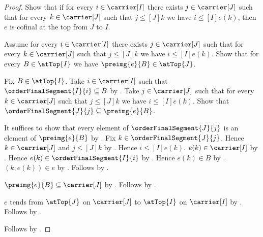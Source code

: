 \begin{proof}
    Show that if for every $i\in\carrier[I]$ there exists
        $j\in\carrier[J]$ such that for every $k\in\carrier[J]$
        such that $j\mathrel{\leq[J]}k$ we have
        $i\mathrel{\leq[I]}e(k)$, then
        $e$ is cofinal at the top from $J$ to $I$.
    \begin{subproof}
        Assume for every $i\in\carrier[I]$ there exists
            $j\in\carrier[J]$ such that for every $k\in\carrier[J]$
            such that $j\mathrel{\leq[J]}k$ we have
            $i\mathrel{\leq[I]}e(k)$.
        Show that for every $B\in\atTop{I}$ we have
            $\preimg{e}{B}\in\atTop{J}$.
        \begin{subproof}
            Fix $B\in\atTop{I}$.
            Take $i\in\carrier[I]$ such that
                $\orderFinalSegment{I}{i}\subseteq B$ by
                .
            Take $j\in\carrier[J]$ such that for every
                $k\in\carrier[J]$ such that
                $j\mathrel{\leq[J]}k$ we have
                $i\mathrel{\leq[I]}e(k)$.
            Show that $\orderFinalSegment{J}{j}\subseteq
                \preimg{e}{B}$.
            \begin{subproof}
                It suffices to show that every element of
                    $\orderFinalSegment{J}{j}$ is an element of
                    $\preimg{e}{B}$ by .
                Fix $k\in\orderFinalSegment{J}{j}$.
                Hence $k\in\carrier[J]$ and
                    $j\mathrel{\leq[J]}k$ by
                    .
                Hence $i\mathrel{\leq[I]}e(k)$.
                $e(k)\in\carrier[I]$ by .
                Hence $e(k)\in\orderFinalSegment{I}{i}$ by
                    .
                Hence $e(k)\in B$ by .
                $(k,e(k))\in e$ by
                    .
                Follows by .
            \end{subproof}
            $\preimg{e}{B}\subseteq\carrier[J]$ by
                .
            Follows by .
        \end{subproof}
        $e$ tends from $\atTop{J}$ on $\carrier[J]$ to
            $\atTop{I}$ on $\carrier[I]$ by
            .
        Follows by .
    \end{subproof}
    Follows by \auto.
\end{proof}

